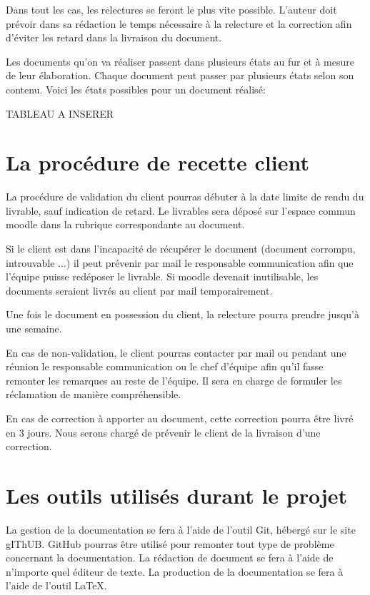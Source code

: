 Dans tout les cas, les relectures se feront le plus vite possible.
L’auteur doit prévoir dans sa rédaction le temps nécessaire à la relecture et la correction afin d’éviter les retard dans la livraison du document.

Les documents qu'on va réaliser passent dans plusieurs états au fur et à mesure de leur élaboration. Chaque document peut passer par plusieurs états selon son contenu. Voici les états possibles pour un document réalisé:

TABLEAU A INSERER %


\section{La procédure de recette client}

La procédure de validation du client pourras débuter à la date limite de rendu du livrable, sauf indication de retard. Le livrables sera déposé sur l'espace commun moodle dans la rubrique correspondante au document.

Si le client est dans l’incapacité de récupérer le document (document corrompu, introuvable ...) il peut prévenir par mail le responsable communication afin que l’équipe puisse redéposer le livrable.
Si moodle devenait inutilisable, les documents seraient livrés au client par mail temporairement.

Une fois le document en possession du client, la relecture pourra prendre jusqu’à une semaine.

En cas de non-validation, le client pourras contacter par mail ou pendant une réunion le responsable communication ou le chef d’équipe afin qu’il fasse remonter les remarques au reste de l’équipe.
Il sera en charge de formuler les réclamation de manière compréhensible.

En cas de correction à apporter au document, cette correction pourra être livré en 3 jours.
Nous serons chargé de prévenir le client de la livraison d’une correction.

\section{Les outils utilisés durant le projet}

La gestion de la documentation se fera à l’aide de l’outil Git, hébergé sur le site gIThUB.
GitHub pourras être utilisé pour remonter tout type de problème concernant la documentation.
La rédaction de document se fera à l’aide de n’importe quel éditeur de texte.
La production de la documentation se fera à l’aide de l'outil LaTeX.

